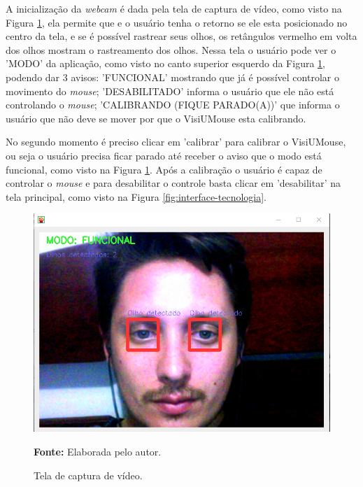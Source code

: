

A inicialização da \textit{webcam} é dada pela tela de captura de vídeo, como visto na Figura \ref{fig:visiumouse-tela-captura-video}, ela permite que e o usuário tenha o retorno se ele esta posicionado no centro da tela, e se é possível rastrear seus olhos, os retângulos vermelho em volta dos olhos mostram o rastreamento dos olhos. Nessa tela o usuário pode ver o 'MODO' da aplicação, como visto no canto superior esquerdo da Figura \ref{fig:visiumouse-tela-captura-video}, podendo dar 3 avisos: 'FUNCIONAL' mostrando que já é possível controlar o movimento do \textit{mouse}; 'DESABILITADO' informa o usuário que ele não está controlando o \textit{mouse}; 'CALIBRANDO (FIQUE PARADO(A))' que informa o usuário que não deve se mover por que o VisiUMouse esta calibrando.

No segundo momento é preciso clicar em 'calibrar' para calibrar o VisiUMouse, ou seja o usuário precisa ficar parado até receber o aviso que o modo está funcional, como visto na Figura \ref{fig:visiumouse-tela-captura-video}. Após a calibração o usuário é capaz de controlar o \textit{mouse} e para desabilitar o controle basta clicar em 'desabilitar' na tela principal, como visto na Figura \ref{fig:interface-tecnologia}.

\begin{figure}[H]
\caption{Tela de captura de vídeo.} 
\centering \includegraphics[scale=.45]{img/visiumouse-tela-captura-video.png}

{\fontsize{11}{11}\selectfont \textbf{Fonte:} Elaborada pelo autor.}
\label{fig:visiumouse-tela-captura-video}
\end{figure}



